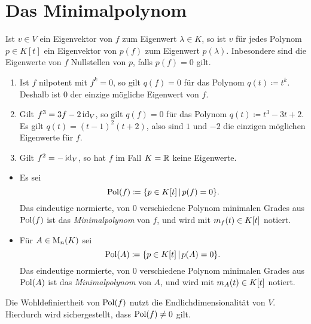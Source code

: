 \section{Das Minimalpolynom}

\begin{lemma}
  \label{lemma: polynomial equations give restriction for the eigenvalues}
  Ist $v \in V$ ein Eigenvektor von $f$ zum Eigenwert $\lambda \in K$, so ist $v$ für jedes Polynom $p \in K[t]$ ein Eigenvektor von $p(f)$ zum Eigenwert $p(\lambda)$.
  Inbesondere sind die Eigenwerte von $f$ Nullstellen von $p$, falls $p(f) = 0$ gilt.
\end{lemma}

\begin{example}
  \leavevmode
  \begin{enumerate}
    \item
      Ist $f$ nilpotent mit $f^k = 0$, so gilt $q(f) = 0$ für das Polynom $q(t) \coloneqq t^k$.
      Deshalb ist $0$ der einzige mögliche Eigenwert von $f$.
    \item
      Gilt $f^3 = 3f - 2 \operatorname{id}_V$, so gilt $q(f) = 0$ für das Polynom $q(t) \coloneqq t^3 - 3t + 2$.
      Es gilt $q(t) = (t-1)^2 (t+2)$, also sind $1$ und $-2$ die einzigen möglichen Eigenwerte für $f$.
    \item
      Gilt $f^2 = -\operatorname{id}_V$, so hat $f$ im Fall $K = \mathbb{R}$ keine Eigenwerte.
  \end{enumerate}
\end{example}

\begin{definition}
  \leavevmode
  \begin{itemize}
    \item
      Es sei
      \[
                  \operatorname{Pol}(f)
        \coloneqq \{ p \in K[t] \,|\, p(f) = 0 \}.
      \]
      Das eindeutige normierte, von $0$ verschiedene Polynom minimalen Grades aus $\operatorname{Pol}(f)$ ist das \emph{Minimalpolynom} von $f$, und wird mit $m_{f}(t) \in K[t]$ notiert.
    \item
      Für $A \in \operatorname{M}_{n}(K)$ sei
      \[
                  \operatorname{Pol}(A)
        \coloneqq \{ p \in K[t] \,|\, p(A) = 0 \}.
      \]
      Das eindeutige normierte, von $0$ verschiedene Polynom minimalen Grades aus $\operatorname{Pol}(A)$ ist das \emph{Minimalpolynom} von $A$, und wird mit $m_{A}(t) \in K[t]$ notiert.
  \end{itemize}
\end{definition}

\begin{remark}
  Die Wohldefiniertheit von $\operatorname{Pol}(f)$ nutzt die Endlichdimensionalität von $V$.
  Hierdurch wird sichergestellt, dass $\operatorname{Pol}(f) \neq 0$ gilt.
\end{remark}

